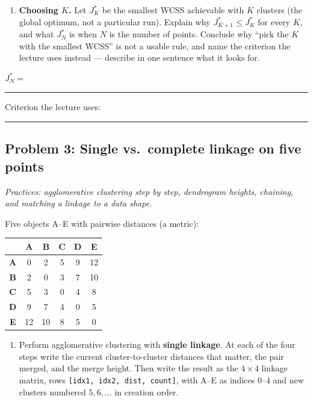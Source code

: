 \documentclass[
  11pt,
]{article}
\providecommand{\tightlist}{%
  \setlength{\itemsep}{0pt}\setlength{\parskip}{0pt}}
\newcommand{\answerspace}[1]{\par\vspace*{#1}}  %
\newcommand{\blank}[1][1.2in]{\rule{#1}{0.4pt}}
\newcommand{\answerpage}{\clearpage}
\begin{document}
\answerspace{2in}

\begin{enumerate}
\def\labelenumi{(\alph{enumi})}
\setcounter{enumi}{3}
\tightlist
\item
  \textbf{Choosing \(K\).} Let \(J^*_K\) be the smallest WCSS achievable
  with \(K\) clusters (the global optimum, not a particular run).
  Explain why \(J^*_{K+1} \le J^*_K\) for every \(K\), and what
  \(J^*_N\) is when \(N\) is the number of points. Conclude why ``pick
  the \(K\) with the smallest WCSS'' is not a usable rule, and name the
  criterion the lecture uses instead --- describe in one sentence what
  it looks for.
\end{enumerate}

\(J^*_N =\) \blank[0.8in] \qquad Criterion the lecture uses:
\blank[1.5in]

\answerspace{2.2in}

\answerpage

\subsection{Problem 3: Single vs.~complete linkage on five
points}\label{problem-3-single-vs.-complete-linkage-on-five-points}

\emph{Practices: agglomerative clustering step by step, dendrogram
heights, chaining, and matching a linkage to a data shape.}

Five objects A--E with pairwise distances (a metric):

\begin{longtable}[]{@{}cccccc@{}}
\toprule\noalign{}
& A & B & C & D & E \\
\midrule\noalign{}
\endhead
\bottomrule\noalign{}
\endlastfoot
\textbf{A} & 0 & 2 & 5 & 9 & 12 \\
\textbf{B} & 2 & 0 & 3 & 7 & 10 \\
\textbf{C} & 5 & 3 & 0 & 4 & 8 \\
\textbf{D} & 9 & 7 & 4 & 0 & 5 \\
\textbf{E} & 12 & 10 & 8 & 5 & 0 \\
\end{longtable}

\begin{enumerate}
\def\labelenumi{(\alph{enumi})}
\tightlist
\item
  Perform agglomerative clustering with \textbf{single linkage}. At each
  of the four steps write the current cluster-to-cluster distances that
  matter, the pair merged, and the merge height. Then write the result
  as the \(4\times4\) linkage matrix, rows
  \texttt{{[}idx1,\ idx2,\ dist,\ count{]}}, with A--E as indices
  \(0\)--\(4\) and new clusters numbered \(5, 6, \dots\) in creation
  order.
\end{enumerate}
\end{document}
